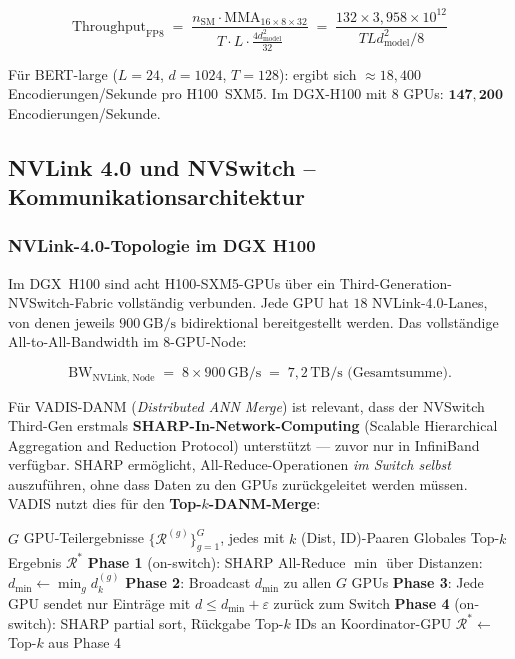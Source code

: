 ﻿\documentclass[12pt,a4paper]{article}
\begin{document}
\begin{equation}
  \text{Throughput}_{\text{FP8}} \;=\;
  \frac{n_{\text{SM}} \cdot \text{MMA}_{16 \times 8 \times 32}}
       {T \cdot L \cdot \frac{4 d_{\text{model}}^2}{32}}
  \;=\; \frac{132 \times 3{,}958 \times 10^{12}}{T L d_{\text{model}}^2 / 8}
\end{equation}

Für BERT-large ($L=24$, $d=1024$, $T=128$): ergibt sich
$\approx 18{,}400$ Encodierungen/Se\-kun\-de pro H100~SXM5.
Im DGX-H100 mit 8 GPUs: $\mathbf{147{,}200}$ Encodierungen/Sekunde.

\subsection{NVLink 4.0 und NVSwitch -- Kommunikationsarchitektur}
\label{sub:nvlink4}

\subsubsection{NVLink-4.0-Topologie im DGX H100}

Im DGX~H100 sind acht H100-SXM5-GPUs über ein
Third-Generation-NVSwitch-Fabric vollständig verbunden.
Jede GPU hat $18$ NVLink-4.0-Lanes, von denen jeweils
$900\,\text{GB/s}$ bidirektional bereitgestellt werden.
Das vollständige All-to-All-Bandwidth im 8-GPU-Node:

\begin{equation}
  \text{BW}_{\text{NVLink, Node}} \;=\; 8 \times 900\,\text{GB/s}
  \;=\; 7{,}2\,\text{TB/s (Gesamtsumme).}
\end{equation}

Für VADIS-DANM (\textit{Distributed ANN Merge}) ist relevant,
dass der NVSwitch Third-Gen erstmals
\textbf{SHARP-In-Network-Computing} (Scalable Hierarchical
Aggregation and Reduction Protocol) unterstützt ---
zuvor nur in InfiniBand verfügbar. SHARP ermöglicht,
All-Reduce-Operationen \emph{im Switch selbst} auszuführen,
ohne dass Daten zu den GPUs zurückgeleitet werden müssen.
VADIS nutzt dies für den \textbf{Top-$k$-DANM-Merge}:

\begin{algorithm}[ht]
\small
\caption{SHARP-beschleunigter DANM-Merge im DGX H100}
\label{alg:sharp_merge}
\begin{algorithmic}[1]
\Require $G$ GPU-Teilergebnisse $\{\mathcal{R}^{(g)}\}_{g=1}^G$,
         jedes mit $k$ (Dist, ID)-Paaren
\Ensure Globales Top-$k$ Ergebnis $\mathcal{R}^*$
\State \textbf{Phase 1} (on-switch): SHARP All-Reduce $\min$ über
       Distanzen: $d_{\min} \gets \min_g d_k^{(g)}$
\State \textbf{Phase 2}: Broadcast $d_{\min}$ zu allen $G$ GPUs
\State \textbf{Phase 3}: Jede GPU sendet nur Einträge mit
       $d \leq d_{\min} + \varepsilon$ zurück zum Switch
\State \textbf{Phase 4} (on-switch): SHARP partial sort,
       Rückgabe Top-$k$ IDs an Koordinator-GPU
\State \Return $\mathcal{R}^* \gets$ Top-$k$ aus Phase 4
\end{algorithmic}
\end{algorithm}
\end{document}
